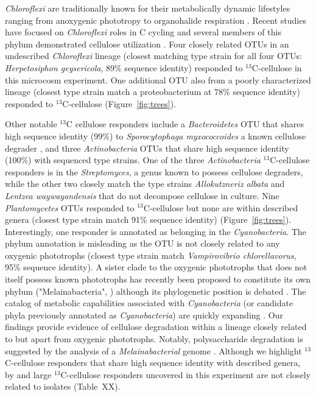 \textit{Chloroflexi} are traditionally known for their metabolically dynamic
lifestyles ranging from anoxygenic phototropy to organohalide respiration
\citep{Hug_2013}. Recent studies have focused on \textit{Chloroflexi} roles in C
cycling \citep{Hug_2013, Goldfarb_2011,Cole_2013} and several members of this
phylum demonstrated cellulose utilization \citep{Goldfarb_2011, Cole_2013,
Hug_2013}. Four closely related OTUs in an undescribed \textit{Chloroflexi}
lineage (closest matching type strain for all four OTUs: \textit{Herpetosiphon
geysericola}, 89\% sequence identity) responded to $^{13}$C-cellulose in this
microcosm experiment. One additional OTU also from a poorly characterized
lineage (closest type strain match a proteobacterium at 78\% sequence identity)
responded to $^{13}$C-cellulose (Figure~\ref{fig:trees}).

Other notable $^{13}$C cellulose responders include a \textit{Bacteroidetes}
OTU that shares high sequence identity (99\%) to \textit{Sporocytophaga
myxococcoides} a known cellulose degrader \citep{Vance_1980}, and three
\textit{Actinobacteria} OTUs that share high sequence identity (100\%) with
sequenced type strains. One of the three \textit{Actinobacteria}
$^{13}$C-cellulose responders is in the \textit{Streptomyces}, a genus known to
possess cellulose degraders, while the other two closely match the type strains
\textit{Allokutzneriz albata} \citep{Labeda_2008, Tomita_1993} and
\textit{Lentzea waywayandensis} \citep{LABEDA_1989, Labeda_2001} that do not
decompose cellulose in culture. Nine \textit{Plantomycetes} OTUs responded to
$^{13}$C-cellulose but none are within described genera (closest type strain
match 91\% sequence identity) (Figure~\ref{fig:trees}). Interestingly, one
responder is annotated as belonging in the \textit{Cyanobacteria}. The phylum
annotation is misleading as the OTU is not closely related to any oxygenic
phototrophs (closest type strain match \textit{Vampirovibrio chlorellavorus},
95\% sequence identity). A sister clade to the oxygenic phototrophs that does
not itself possess known phototrophs has recently been proposed to constitute
its own phylum ("Melainabacteria", \citep{Di_Rienzi_2013}) although its
phylogenetic position is debated \citep{Soo_2014}. The catalog of metabolic
capabilities associated with \textit{Cyanobacteria} (or candidate phyla
previously annotated as \textit{Cyanobacteria}) are quickly expanding
\citep{Di_Rienzi_2013, Soo_2014}.  Our findings provide evidence of cellulose
degradation within a lineage closely related to but apart from oxygenic
phototrophs. Notably, polysaccharide degradation is suggested by the analysis
of a \textit{Melainabacterial} genome \citep{Di_Rienzi_2013}. Although we
highlight $^{13}$C-cellulose responders that share high sequence identity with
described genera, by and large $^{13}$C-cellulose responders uncovered in this
experiment are not closely related to isolates (Table~XX).

